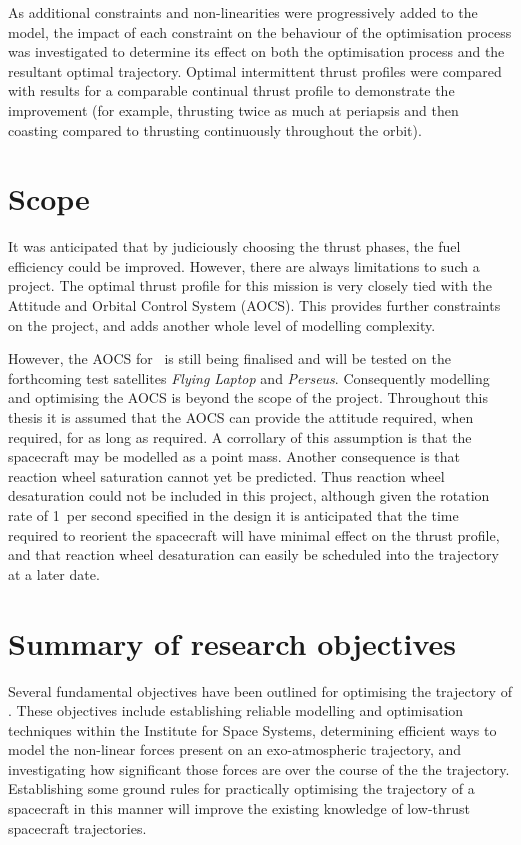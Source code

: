 As additional constraints and non-linearities were progressively added to the model, the impact of each constraint on the behaviour of the optimisation process was investigated to determine its effect on both the optimisation process and the resultant optimal trajectory. Optimal intermittent thrust profiles were compared with results for a comparable continual thrust profile to demonstrate the improvement (for example, thrusting twice as much at periapsis and then coasting compared to thrusting continuously throughout the orbit). 

\section{Scope}

It was anticipated that by judiciously choosing the thrust phases, the fuel efficiency could be improved. However, there are always limitations to such a project. The optimal thrust profile for this mission is very closely tied with the Attitude and Orbital Control System (AOCS). This provides further constraints on the project, and adds another whole level of modelling complexity. 

However, the AOCS for \BW\ is still being finalised and will be tested on the forthcoming test satellites \emph{Flying Laptop} and \emph{Perseus}. Consequently modelling and optimising the AOCS is beyond the scope of the project. Throughout this thesis it is assumed that the AOCS can provide the attitude required, when required, for as long as required. A corrollary of this assumption is that the spacecraft may be modelled as a point mass. Another consequence is that reaction wheel saturation cannot yet be predicted. Thus reaction wheel desaturation could not be included in this project, although given the rotation rate of 1\degrees\ per second specified in the design it is anticipated that the time required to reorient the spacecraft will have minimal effect on the thrust profile, and that reaction wheel desaturation can  easily be scheduled into the trajectory at a later date.

\section{Summary of research objectives} \label{sec:Objective-summary}

Several fundamental objectives have been outlined for optimising the trajectory of \BW. These objectives include establishing reliable modelling and optimisation techniques within the Institute for Space Systems, determining efficient ways to model the non-linear forces present on an exo-atmospheric trajectory, and investigating how significant those forces are over the course of the the trajectory. Establishing some ground rules for practically optimising the trajectory of a spacecraft in this manner will improve the existing knowledge of low-thrust spacecraft trajectories.